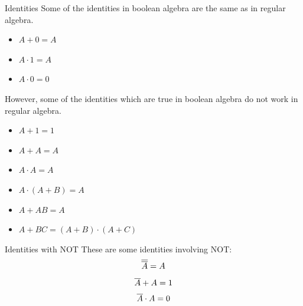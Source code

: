 	\begin{namedframe}{Identities}
		Some of the identities in boolean algebra are the same as in regular algebra.
		\begin{itemize}[<+(1)->]
			\item $A + 0 = A$
			\item $A \cdot 1 = A$
			\item $A \cdot 0 = 0$
		\end{itemize}
		\pause
		However, some of the identities which are true in boolean algebra do not work in regular algebra.
		\begin{center}
			\begin{minipage}{0.25\textwidth}
				\begin{itemize}[<+(1)->]
					\item $A + 1 = 1$
					\item $A + A = A$
					\item $A \cdot A = A$
				\end{itemize}
			\end{minipage}
			\begin{minipage}{0.65\textwidth}
				\begin{itemize}[<+(1)->]
					\item $A \cdot (A + B) = A$
					\item $A + AB = A$
					\item $A + BC = (A + B) \cdot (A + C)$
				\end{itemize}
			\end{minipage}
		\end{center}
	\end{namedframe}
	\begin{namedframe}{Identities with NOT}
		These are some identities involving NOT:
		\pause
		\[\overline{\overline{A}} = A\]
		\pause
		\[\overline{A} + A = 1\]
		\pause
		\[\overline{A} \cdot A = 0\]
	\end{namedframe}
